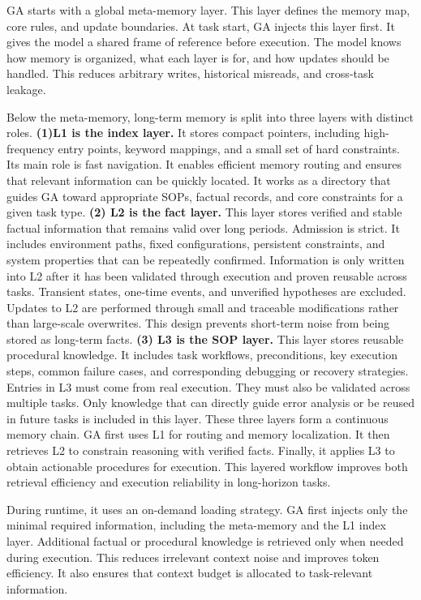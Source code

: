 GA starts with a global meta-memory layer.  
This layer defines the memory map, core rules, and update boundaries.  
At task start, GA injects this layer first.  
It gives the model a shared frame of reference before execution.  
The model knows how memory is organized, what each layer is for, and how updates should be handled.  
This reduces arbitrary writes, historical misreads, and cross-task leakage.

Below the meta-memory, long-term memory is split into three layers with distinct roles.
\textbf{(1)L1 is the index layer.} 
It stores compact pointers, including high-frequency entry points, keyword mappings, and a small set of hard constraints.  
Its main role is fast navigation. It enables efficient memory routing and ensures that relevant information can be quickly located. It works as a directory that guides GA toward appropriate SOPs, factual records, and core constraints for a given task type.
\textbf{(2) L2 is the fact layer.}
This layer stores verified and stable factual information that remains valid over long periods.
Admission is strict.
It includes environment paths, fixed configurations, persistent constraints, and system properties that can be repeatedly confirmed.
Information is only written into L2 after it has been validated through execution and proven reusable across tasks.
Transient states, one-time events, and unverified hypotheses are excluded.
Updates to L2 are performed through small and traceable modifications rather than large-scale overwrites.
This design prevents short-term noise from being stored as long-term facts.
\textbf{(3) L3 is the SOP layer.}
This layer stores reusable procedural knowledge.
It includes task workflows, preconditions, key execution steps, common failure cases, and corresponding debugging or recovery strategies.
Entries in L3 must come from real execution.
They must also be validated across multiple tasks.
Only knowledge that can directly guide error analysis or be reused in future tasks is included in this layer. 
These three layers form a continuous memory chain.
GA first uses L1 for routing and memory localization.
It then retrieves L2 to constrain reasoning with verified facts.
Finally, it applies L3 to obtain actionable procedures for execution.
This layered workflow improves both retrieval efficiency and execution reliability in long-horizon tasks.

During runtime, it uses an on-demand loading strategy. 
GA first injects only the minimal required information, including the meta-memory and the L1 index layer.
Additional factual or procedural knowledge is retrieved only when needed during execution.
This reduces irrelevant context noise and improves token efficiency.
It also ensures that context budget is allocated to task-relevant information.

